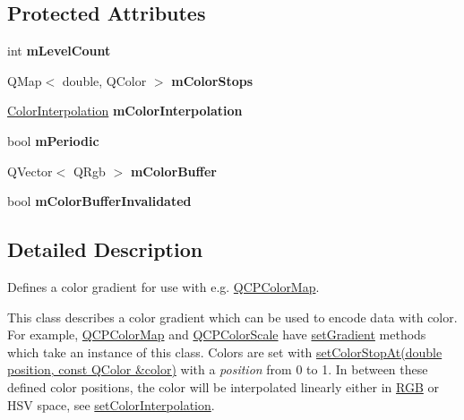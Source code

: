 \subsection*{Protected Attributes}
\begin{DoxyCompactItemize}
\item 
\hypertarget{classQCPColorGradient_a98fb68e359904b2c991fcae3e38a211a}{}int {\bfseries m\+Level\+Count}\label{classQCPColorGradient_a98fb68e359904b2c991fcae3e38a211a}

\item 
\hypertarget{classQCPColorGradient_a9e11a2b0974ef289d12c324822bc3a3e}{}Q\+Map$<$ double, Q\+Color $>$ {\bfseries m\+Color\+Stops}\label{classQCPColorGradient_a9e11a2b0974ef289d12c324822bc3a3e}

\item 
\hypertarget{classQCPColorGradient_a028cef73d863800a9ee93ffd641cce01}{}\hyperlink{classQCPColorGradient_ac5dca17cc24336e6ca176610e7f77fc1}{Color\+Interpolation} {\bfseries m\+Color\+Interpolation}\label{classQCPColorGradient_a028cef73d863800a9ee93ffd641cce01}

\item 
\hypertarget{classQCPColorGradient_a4b07deeb20ca1ee2d5ea7e01bf0420af}{}bool {\bfseries m\+Periodic}\label{classQCPColorGradient_a4b07deeb20ca1ee2d5ea7e01bf0420af}

\item 
\hypertarget{classQCPColorGradient_af8b5f0739faa5f8295154d47ce38ecff}{}Q\+Vector$<$ Q\+Rgb $>$ {\bfseries m\+Color\+Buffer}\label{classQCPColorGradient_af8b5f0739faa5f8295154d47ce38ecff}

\item 
\hypertarget{classQCPColorGradient_abacf55e11f67d6722a687af1bb2687bd}{}bool {\bfseries m\+Color\+Buffer\+Invalidated}\label{classQCPColorGradient_abacf55e11f67d6722a687af1bb2687bd}

\end{DoxyCompactItemize}


\subsection{Detailed Description}
Defines a color gradient for use with e.\+g. \hyperlink{classQCPColorMap}{Q\+C\+P\+Color\+Map}. 

This class describes a color gradient which can be used to encode data with color. For example, \hyperlink{classQCPColorMap}{Q\+C\+P\+Color\+Map} and \hyperlink{classQCPColorScale}{Q\+C\+P\+Color\+Scale} have \hyperlink{classQCPColorMap_a7313c78360471cead3576341a2c50377}{set\+Gradient} methods which take an instance of this class. Colors are set with \hyperlink{classQCPColorGradient_a3b48be5e78079db1bb2a1188a4c3390e}{set\+Color\+Stop\+At(double position, const Q\+Color \&color)} with a {\itshape position} from 0 to 1. In between these defined color positions, the color will be interpolated linearly either in \hyperlink{structRGB}{R\+G\+B} or H\+S\+V space, see \hyperlink{classQCPColorGradient_aa13fda86406e1d896a465a409ae63b38}{set\+Color\+Interpolation}.

